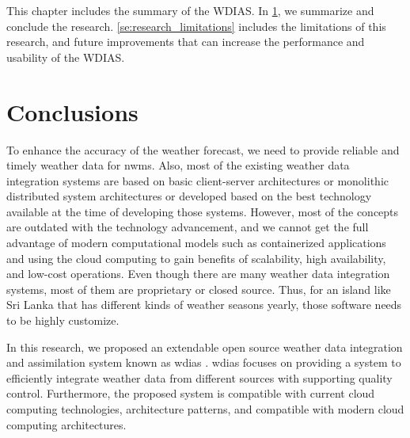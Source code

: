 This chapter includes the summary of the WDIAS. In \cref{se:summary_conclusion}, we summarize and conclude the research. \cref{se:research_limitations} includes the limitations of this research, and future improvements that can increase the performance and usability of the WDIAS.

\section{Conclusions}
\label{se:summary_conclusion}

To enhance the accuracy of the weather forecast, we need to provide reliable and timely weather data for \acrshort{nwm}s. Also, most of the existing weather data integration systems are based on basic client-server architectures or monolithic distributed system architectures or developed based on the best technology available at the time of developing those systems. However, most of the concepts are outdated with the technology advancement, and we cannot get the full advantage of modern computational models such as containerized applications and using the cloud computing to gain benefits of scalability, high availability, and low-cost operations. Even though there are many weather data integration systems, most of them are proprietary or closed source. Thus, for an island like Sri Lanka that has different kinds of weather seasons yearly, those software needs to be highly customize.

In this research, we proposed an extendable open source weather data integration and assimilation system known as \acrfull{wdias} \cite{KarunarathneWeatherCode}. \acrshort{wdias} focuses on providing a system to efficiently integrate weather data from different sources with supporting quality control. Furthermore, the proposed system is compatible with current cloud computing technologies, architecture patterns, and compatible with modern cloud computing architectures.

